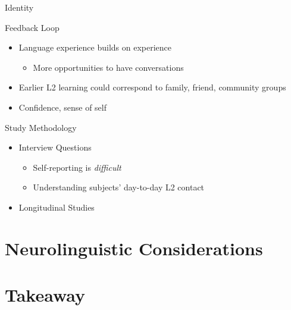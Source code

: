 \documentclass{beamer}
\begin{document}
\begin{frame}{Identity}
  
\end{frame}

\begin{frame}{Feedback Loop}
  \begin{itemize}
    \item Language experience builds on experience
    \begin{itemize}
      \item More opportunities to have conversations
    \end{itemize}
    \item Earlier L2 learning could correspond to family, friend, community groups
    \item Confidence, sense of self
  \end{itemize}
\end{frame}

\begin{frame}{Study Methodology}
    \begin{itemize}
        \item Interview Questions
        \begin{itemize}
          \item Self-reporting is \emph{difficult}
          \item Understanding subjects' day-to-day L2 contact
        \end{itemize}
        \item Longitudinal Studies
    \end{itemize}
\end{frame}

\section{Neurolinguistic Considerations}

\section{Takeaway}
\end{document}
